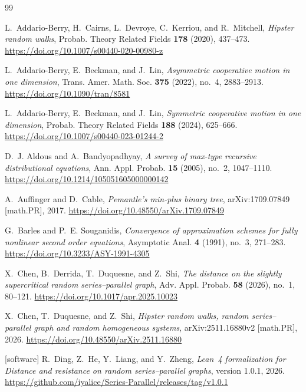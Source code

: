 \documentclass[a4paper,fleqn]{cas-sc}
\newif\ifshowrevisions
\DeclareRobustCommand{\rev}[1]{{\ifshowrevisions\color{blue}\fi#1}}
\numberwithin{equation}{section}
\theoremstyle{plain}
\theoremstyle{definition}
\begin{document}
\begin{thebibliography}{99}

L.~Addario-Berry, H.~Cairns, L.~Devroye, C.~Kerriou, and R.~Mitchell,
\emph{Hipster random walks},
Probab. Theory Related Fields \textbf{178} (2020), 437--473.
\url{https://doi.org/10.1007/s00440-020-00980-z}

L.~Addario-Berry, E.~Beckman, and J.~Lin,
\emph{Asymmetric cooperative motion in one dimension},
Trans. Amer. Math. Soc. \textbf{375} (2022), no.~4, 2883--2913.
\url{https://doi.org/10.1090/tran/8581}

L.~Addario-Berry, E.~Beckman, and J.~Lin,
\emph{Symmetric cooperative motion in one dimension},
Probab. Theory Related Fields \textbf{188} (2024), 625--666.
\url{https://doi.org/10.1007/s00440-023-01244-2}

D.~J. Aldous and A.~Bandyopadhyay,
\emph{A survey of max-type recursive distributional equations},
Ann. Appl. Probab. \textbf{15} (2005), no.~2, 1047--1110.
\url{https://doi.org/10.1214/105051605000000142}

A.~Auffinger and D.~Cable,
\emph{Pemantle's min-plus binary tree},
arXiv:1709.07849 [math.PR], 2017.
\url{https://doi.org/10.48550/arXiv.1709.07849}

G.~Barles and P.~E. Souganidis,
\emph{Convergence of approximation schemes for fully nonlinear second order
equations},
Asymptotic Anal. \textbf{4} (1991), no.~3, 271--283.
\url{https://doi.org/10.3233/ASY-1991-4305}

X.~Chen, B.~Derrida, T.~Duquesne, and Z.~Shi,
\emph{The distance on the slightly supercritical random series--parallel graph},
Adv. Appl. Probab. \textbf{58} (2026), no.~1, 80--121.
\url{https://doi.org/10.1017/apr.2025.10023}

X.~Chen, T.~Duquesne, and Z.~Shi,
\emph{Hipster random walks, random series--parallel graph and random homogeneous
systems},
arXiv:2511.16880v2 [math.PR], 2026.
\url{https://doi.org/10.48550/arXiv.2511.16880}

\rev{[software] R.~Ding, Z.~He, Y.~Liang, and Y.~Zheng,}
\rev{\emph{Lean~4 formalization for Distance and resistance on random
series--parallel graphs}, version 1.0.1, 2026.}
\rev{\url{https://github.com/iyalice/Series-Parallel/releases/tag/v1.0.1}}


\end{thebibliography}
\end{document}
